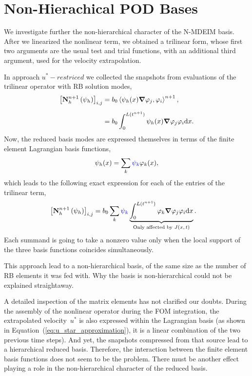 \documentclass[../../thesis.tex]{subfiles}
\newcommand{\inner}[2]{\left<#1, #2\right>}
\newcommand{\Ah}[1]{\ensuremath{\vb{#1}^{n+1}_h}}
\begin{document}
\section{Non-Hierachical POD Bases}
We investigate further the non-hierarchical character of the N-MDEIM basis.
After we linearized the nonlinear term, we obtained a trilinear form,
whose first two arguments are the usual test and trial functions,
with an additional third argument, used for the velocity extrapolation.

In approach $u^{*}-restriced$ we collected the snapshots from evaluations 
of the trilinear operator with RB solution modes,
\begin{equation}
    \begin{split}
        \qty[\Ah{N}\left(\psi_{h}\right)]_{i,j}
        &= b_0 \inner{\psi_h(x)\grad \varphi_j}{\varphi_i}^{n+1},
        \\[2mm]
        &= b_0 \int_{0}^{L(t^{n+1})} \psi_h(x) \grad \varphi_j \varphi_i \dd x.
    \end{split}
\end{equation}
Now, the reduced basis modes are expressed themselves in terms of 
the finite element Lagrangian basis functions,
\begin{equation}
    \psi_h(x) = \sum_{k} 
    \textcolor{blue}{\psi_k} 
    \varphi_{k}(x),
\end{equation}
which leads to the following exact expression for each of the entries of the trilinear term,
\begin{equation}
    \begin{split}
        \qty[\Ah{N}\left(\psi_{h}\right)]_{i,j}
        &= b_0 \sum_k 
        \textcolor{blue}{\psi_k} 
        \underbrace{\int_{0}^{L(t^{n+1})} 
        \varphi_{k} \grad \varphi_j \varphi_i \dd x}_{\text{Only affected by $J(x, t)$}}.
    \end{split}
    \label{eq:appendix_exact_representation_triliear_form}
\end{equation}
Each summand is going to take a nonzero value only when the local support of the three
basis functions coincides simultaneously.

This approach lead to a non-hierarchical basis, 
of the same size as the number of RB elements it was fed with.
Why the basis is non-hierarchical could not be explained straightaway.

A detailed inspection of the matrix elements has not clarified our doubts.
During the assembly of the nonlinear operator during the FOM integration, 
the extrapolated velocity~$u^{*}$ is also expressed within the Lagrangian basis
(as shown in Equation~(\ref{eq:u_star_approximation}), 
it is a linear combination of the two previous time steps).
And yet, the snapshots compressed from that source lead to a hierarchical reduced basis.
Therefore, the interaction between the finite element basis functions
does not seem to be the problem. 
There must be another effect playing a role 
in the non-hierarchical character of the reduced basis.
\end{document}

